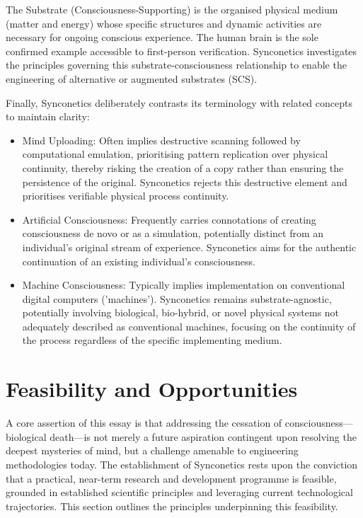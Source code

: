 \documentclass[10pt]{article}
\begin{document}
\begin{sloppypar}
  The Substrate (Consciousness-Supporting) is the organised physical medium (matter and energy) whose specific structures and dynamic activities are necessary for ongoing conscious experience. The human brain is the sole confirmed example accessible to first-person verification. Synconetics investigates the principles governing this substrate-consciousness relationship to enable the engineering of alternative or augmented substrates (SCS).

  Finally, Synconetics deliberately contrasts its terminology with related concepts to maintain clarity:

  \begin{itemize}
    \item Mind Uploading: Often implies destructive scanning followed by computational emulation, prioritising pattern replication over physical continuity, thereby risking the creation of a copy rather than ensuring the persistence of the original. Synconetics rejects this destructive element and prioritises verifiable physical process continuity.

    \item Artificial Consciousness: Frequently carries connotations of creating consciousness de novo or as a simulation, potentially distinct from an individual's original stream of experience. Synconetics aims for the authentic continuation of an existing individual's consciousness.

    \item Machine Consciousness: Typically implies implementation on conventional digital computers ('machines'). Synconetics remains substrate-agnostic, potentially involving biological, bio-hybrid, or novel physical systems not adequately described as conventional machines, focusing on the continuity of the process regardless of the specific implementing medium.
  \end{itemize}

  \section{Feasibility and Opportunities}
  \label{sec:feasibility}

  A core assertion of this essay is that addressing the cessation of consciousness—biological death—is not merely a future aspiration contingent upon resolving the deepest mysteries of mind, but a challenge amenable to engineering methodologies today. The establishment of Synconetics rests upon the conviction that a practical, near-term research and development programme is feasible, grounded in established scientific principles and leveraging current technological trajectories. This section outlines the principles underpinning this feasibility.


\end{sloppypar}
\end{document}
